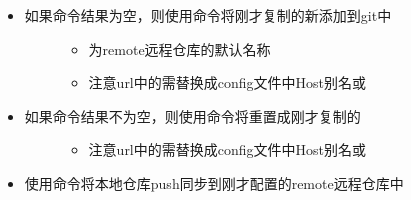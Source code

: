 \documentclass[a4paper,10pt,english]{sphinxmanual}
\begin{document}
\begin{figure}[htbp]
\centering

\noindent{}
\end{figure}
\begin{itemize}
\item {} \begin{description}
\item[{如果命令结果为空，则使用命令将刚才复制的新添加到git中}] \leavevmode\begin{itemize}
\item {} 
为remote远程仓库的默认名称

\item {} 
注意url中的需替换成config文件中Host别名或

\end{itemize}

\end{description}

\end{itemize}

\begin{figure}[htbp]
\centering

\noindent{}
\end{figure}
\begin{itemize}
\item {} \begin{description}
\item[{如果命令结果不为空，则使用命令将重置成刚才复制的}] \leavevmode\begin{itemize}
\item {} 
注意url中的需替换成config文件中Host别名或

\end{itemize}

\end{description}

\end{itemize}

\begin{figure}[htbp]
\centering

\noindent{}
\end{figure}
\begin{itemize}
\item {} 
使用命令将本地仓库push同步到刚才配置的remote远程仓库中

\end{itemize}
\end{document}
